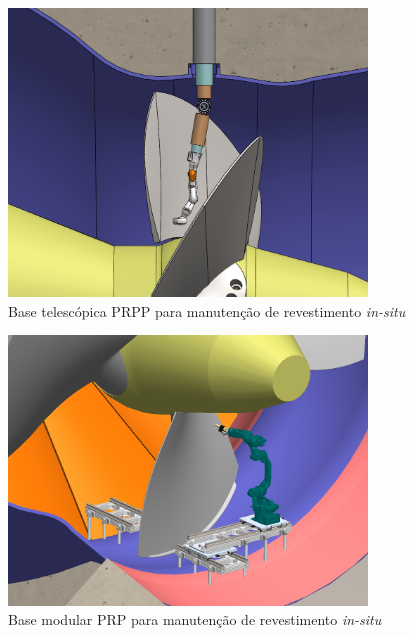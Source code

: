 \begin{figure}[h]
	\centering 
 	\includegraphics[width=0.85\textwidth]{figs/base_telesc_turbina}
 	\caption{Base telescópica PRPP para manutenção de revestimento
 	\textit{in-situ}}
 	\label{fig::base_telesc_turbina}
\end{figure}

\begin{figure}[h]
	\centering 
 	\includegraphics[width=0.85\textwidth]{figs/prp_turbina}
 	\caption{Base modular PRP para manutenção de revestimento \textit{in-situ}}
 	\label{fig::prp_turbina}
\end{figure}




















